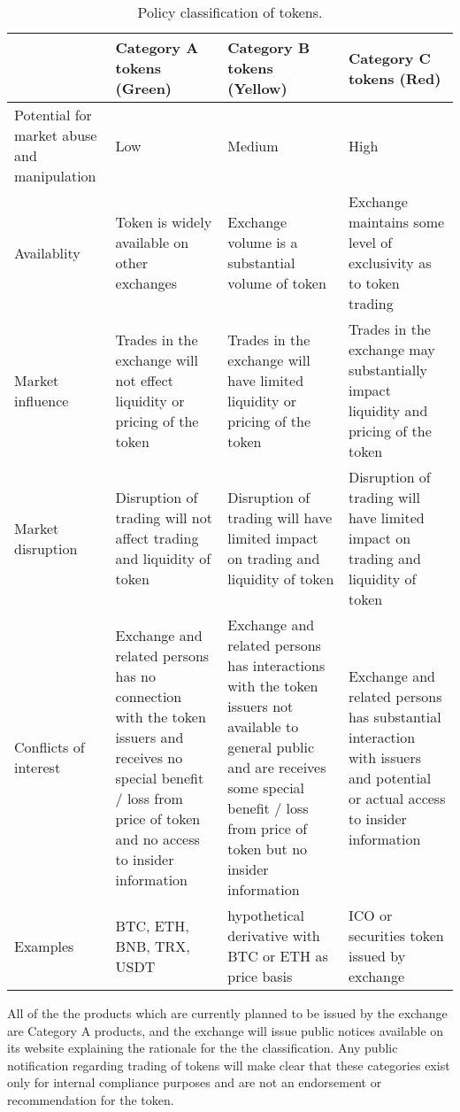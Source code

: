 \begin{table}[htbp]
\centering
\begin{tabularx}{\textwidth}{|X|X|X|X|}
\hline
& \textbf{Category A tokens (Green)} & \textbf{Category B tokens (Yellow)} &
\textbf{Category C tokens (Red)} \\
\hline
Potential for market abuse and manipulation & Low & Medium & High \\
Availablity & Token is widely available on other exchanges & Exchange
volume is a substantial volume of token & Exchange maintains some
level of exclusivity as to token trading \\
\hline
Market influence & Trades in the exchange will not effect
liquidity or pricing of the token & Trades in the exchange will
have limited liquidity or pricing of the token & Trades in the
exchange may substantially impact liquidity and pricing of the token \\
\hline
Market disruption & Disruption of trading will not affect trading and
liquidity of token & Disruption of trading will have limited impact on
trading and liquidity of token & Disruption of trading will have
limited impact on trading and liquidity of token  \\
\hline
Conflicts of interest & Exchange and related persons has no connection
with the token issuers and receives no special benefit / loss from price of
token and no access to insider information & Exchange and related persons has interactions with the token
issuers not available to general public and are receives some special
benefit / loss from price of token but no insider information & Exchange and related persons has
substantial interaction with issuers and potential or actual access to
insider information\\
\hline
Examples & BTC, ETH, BNB, TRX, USDT & hypothetical derivative with BTC
or ETH as price basis & ICO or securities token issued by exchange \\
\hline
\end{tabularx}
\caption{Policy classification of tokens.}
\end{table}

All of the the products which are currently planned to be issued by
the exchange are Category A products, and the exchange will issue
public notices available on its website explaining the rationale for
the the classification.  Any public notification regarding trading of
tokens will make clear that these categories exist only for internal
compliance purposes and are not an endorsement or recommendation for
the token.

